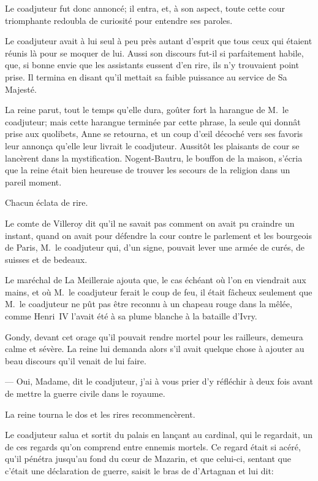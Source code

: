 Le coadjuteur fut donc annoncé; il entra, et, à son aspect, toute cette cour triomphante redoubla de curiosité pour entendre ses paroles.

Le coadjuteur avait à lui seul à peu près autant d'esprit que tous ceux qui étaient réunis là pour se moquer de lui. Aussi son discours fut-il si parfaitement habile, que, si bonne envie que les assistants eussent d'en rire, ils n'y trouvaient point prise. Il termina en disant qu'il mettait sa faible puissance au service de Sa Majesté.

La reine parut, tout le temps qu'elle dura, goûter fort la harangue de M.~le coadjuteur; mais cette harangue terminée par cette phrase, la seule qui donnât prise aux quolibets, Anne se retourna, et un coup d'œil décoché vers ses favoris leur annonça qu'elle leur livrait le coadjuteur. Aussitôt les plaisants de cour se lancèrent dans la mystification. Nogent-Bautru, le bouffon de la maison, s'écria que la reine était bien heureuse de trouver les secours de la religion dans un pareil moment.

Chacun éclata de rire.

Le comte de Villeroy dit qu'il ne savait pas comment on avait pu craindre un instant, quand on avait pour défendre la cour contre le parlement et les bourgeois de Paris, M.~le coadjuteur qui, d'un signe, pouvait lever une armée de curés, de suisses et de bedeaux.

Le maréchal de La Meilleraie ajouta que, le cas échéant où l'on en viendrait aux mains, et où M.~le coadjuteur ferait le coup de feu, il était fâcheux seulement que M.~le coadjuteur ne pût pas être reconnu à un chapeau rouge dans la mêlée, comme Henri~IV l'avait été à sa plume blanche à la bataille d'Ivry.

Gondy, devant cet orage qu'il pouvait rendre mortel pour les railleurs, demeura calme et sévère. La reine lui demanda alors s'il avait quelque chose à ajouter au beau discours qu'il venait de lui faire.

— Oui, Madame, dit le coadjuteur, j'ai à vous prier d'y réfléchir à deux fois avant de mettre la guerre civile dans le royaume.

La reine tourna le dos et les rires recommencèrent.

Le coadjuteur salua et sortit du palais en lançant au cardinal, qui le regardait, un de ces regards qu'on comprend entre ennemis mortels. Ce regard était si acéré, qu'il pénétra jusqu'au fond du cœur de Mazarin, et que celui-ci, sentant que c'était une déclaration de guerre, saisit le bras de d'Artagnan et lui dit:

